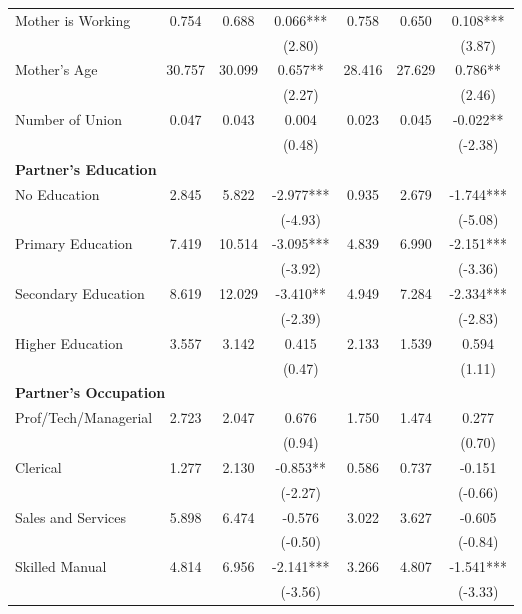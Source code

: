 \begin{table}[htbp]
\begin{tabular}{lcccccc}
Mother is Working & 0.754 & 0.688 & 0.066*** & 0.758 & 0.650 & 0.108*** \\
 & & & (2.80) & & & (3.87) \\
Mother's Age & 30.757 & 30.099 & 0.657** & 28.416 & 27.629 & 0.786** \\
 & & & (2.27) & & & (2.46) \\
Number of Union & 0.047 & 0.043 & 0.004 & 0.023 & 0.045 & -0.022** \\
 & & & (0.48) & & & (-2.38) \\
\multicolumn{7}{l}{\textbf{Partner's Education}} \\
\hspace{0.2in}No Education & 2.845 & 5.822 & -2.977*** & 0.935 & 2.679 & -1.744*** \\
 & & & (-4.93) & & & (-5.08) \\
\hspace{0.2in}Primary Education & 7.419 & 10.514 & -3.095*** & 4.839 & 6.990 & -2.151*** \\
 & & & (-3.92) & & & (-3.36) \\
\hspace{0.2in}Secondary Education & 8.619 & 12.029 & -3.410** & 4.949 & 7.284 & -2.334*** \\
 & & & (-2.39) & & & (-2.83) \\
\hspace{0.2in}Higher Education & 3.557 & 3.142 & 0.415 & 2.133 & 1.539 & 0.594 \\
 & & & (0.47) & & & (1.11) \\
\multicolumn{7}{l}{\textbf{Partner's Occupation}} \\
\hspace{0.2in}Prof/Tech/Managerial & 2.723 & 2.047 & 0.676 & 1.750 & 1.474 & 0.277 \\
 & & & (0.94) & & & (0.70) \\
\hspace{0.2in}Clerical & 1.277 & 2.130 & -0.853** & 0.586 & 0.737 & -0.151 \\
 & & & (-2.27) & & & (-0.66) \\
\hspace{0.2in}Sales and Services & 5.898 & 6.474 & -0.576 & 3.022 & 3.627 & -0.605 \\
 & & & (-0.50) & & & (-0.84) \\
\hspace{0.2in}Skilled Manual & 4.814 & 6.956 & -2.141*** & 3.266 & 4.807 & -1.541*** \\
 & & & (-3.56) & & & (-3.33) \\

\end{tabular}
\end{table}
